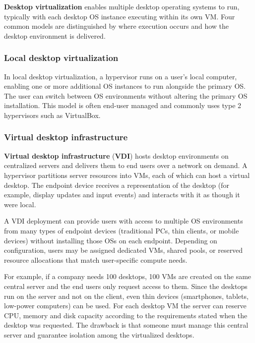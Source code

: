 \textbf{Desktop virtualization} enables multiple desktop operating systems to run, typically with each desktop OS instance executing within its own VM. Four common models are distinguished by where execution occurs and how the desktop environment is delivered.

\subsubsection*{Local desktop virtualization}

In local desktop virtualization, a hypervisor runs on a user's local computer, enabling one or more additional OS instances to run alongside the primary OS. The user can switch between OS environments without altering the primary OS installation. This model is often end-user managed and commonly uses type 2 hypervisors such as VirtualBox.

\subsubsection*{Virtual desktop infrastructure}

\textbf{Virtual desktop infrastructure} (\textbf{VDI}) hosts desktop environments on centralized servers and delivers them to end users over a network on demand. A hypervisor partitions server resources into VMs, each of which can host a virtual desktop. The endpoint device receives a representation of the desktop (for example, display updates and input events) and interacts with it as though it were local.

A VDI deployment can provide users with access to multiple OS environments from many types of endpoint devices (traditional PCs, thin clients, or mobile devices) without installing those OSs on each endpoint. Depending on configuration, users may be assigned dedicated VMs, shared pools, or reserved resource allocations that match user-specific compute needs.

For example, if a company needs 100 desktops, 100 VMs are created on the same central server and the end users only request access to them. Since the desktops run on the server and not on the client, even thin devices (smartphones, tablets, low-power computers) can be used. For each desktop VM the server can reserve CPU, memory and disk capacity according to the requirements stated when the desktop was requested. The drawback is that someone must manage this central server and guarantee isolation among the virtualized desktops.


